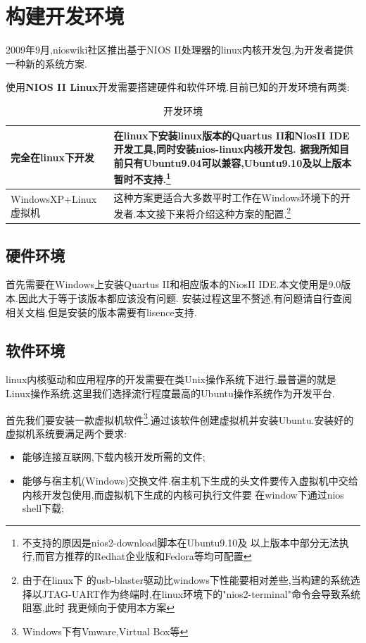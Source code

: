 \documentclass[12pt,a4paper,titlepage]{article}
\begin{document}
\section{构建开发环境}
\setcounter{footnote}{0}
2009年9月,nioswiki社区推出基于NIOS II处理器的linux内核开发包,为开发者提供一种新的系统方案.

使用\textbf{NIOS II Linux}开发需要搭建硬件和软件环境.目前已知的开发环境有两类:
\begin{table}[!hbtp]
\centering
\begin{tabular}{|l|p{}|}
\hline
完全在linux下开发 & 在linux下安装linux版本的Quartus II和NiosII IDE开发工具,同时安装nios-linux内核开发包.
据我所知目前只有\textbf{Ubuntu9.04}可以兼容,Ubuntu9.10及以上版本暂时不支持.\footnote{不支持的原因是nios2-download脚本在Ubuntu9.10及
以上版本中部分无法执行,而官方推荐的Redhat企业版和Fedora等均可配置}\\
\hline
WindowsXP+Linux虚拟机 & 这种方案更适合大多数平时工作在Windows环境下的开发者.本文接下来将介绍这种方案的配置.\footnote{由于在linux下
的usb-blaster驱动比windows下性能要相对差些,当构建的系统选择以JTAG-UART作为终端时,在linux环境下的"nios2-terminal"命令会导致系统阻塞,此时
我更倾向于使用本方案}\\
\hline
\end{tabular}
\caption{开发环境\label{dev_env}}
\end{table}
\subsection{硬件环境}
首先需要在Windows上安装Quartus II和相应版本的NiosII IDE.本文使用是9.0版本.因此大于等于该版本都应该没有问题.
安装过程这里不赘述,有问题请自行查阅相关文档.但是安装的版本{需要有lisence支持}.
\subsection{软件环境}
linux内核驱动和应用程序的开发需要在类Unix操作系统下进行,最普遍的就是Linux操作系统.这里我们选择流行程度最高的Ubuntu操作系统作为开发平台.

首先我们要安装一款虚拟机软件\footnote{Windows下有Vmware,Virtual Box等}.通过该软件创建虚拟机并安装Ubuntu.安装好的虚拟机系统要满足两个要求:
\begin{itemize}
\item 能够连接互联网,下载内核开发所需的文件;
\item 能够与宿主机(Windows)交换文件.宿主机下生成的头文件要传入虚拟机中交给内核开发包使用,而虚拟机下生成的内核可执行文件要
在window下通过nios shell下载;
\end{itemize}
\end{document}
